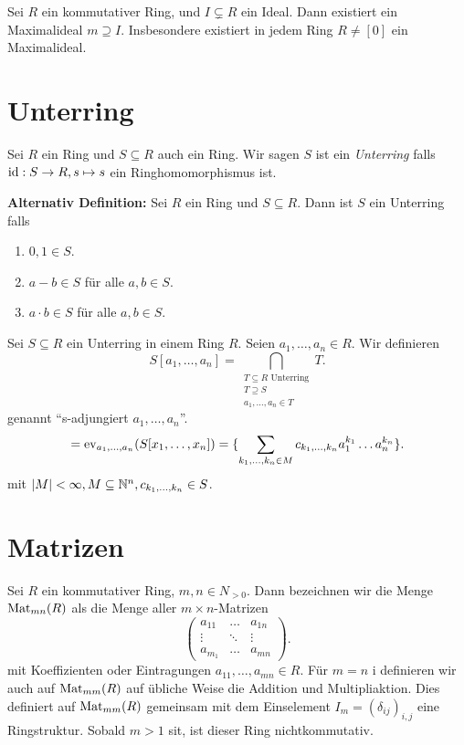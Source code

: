 \begin{theorem}
	Sei $R$ ein kommutativer Ring, und $I \subsetneq R$ ein Ideal. Dann existiert ein Maximalideal $m \supseteq I$.
	Insbesondere existiert in jedem Ring $R \neq [0]$ ein Maximalideal.
\end{theorem}


\section{Unterring}
\begin{definition}
	Sei $R$ ein Ring und $S \subseteq R$ auch ein Ring. Wir sagen $S$ ist ein \emph{Unterring} falls $\operatorname{id}: S \to R, s \mapsto s$ 
	ein Ringhomomorphismus ist.
	
	\textbf{Alternativ Definition:}
	Sei $R$ ein Ring und $S \subseteq R$. Dann ist $S$ ein Unterring falls
	\begin{enumerate}
		\item $0,1 \in S$.
		\item $a-b \in S$ für alle $a,b \in S$.
		\item $a\cdot b \in S$ für alle $a,b \in S$.
	\end{enumerate}
\end{definition}

\begin{notation}
	Sei $S \subseteq R$ ein Unterring in einem Ring $R$.
	Seien $a_1,\ldots,a_{n} \in R$. Wir definieren
	\[
		S[a_1,\ldots,a_{n}] = \bigcap_{\substack{T \subseteq R \text{ Unterring}\\ T \supseteq S\\ a_1,\ldots,a_{n} \in T}} T 
	.\] 
	genannt \enquote{s-adjungiert $a_1,\ldots,a_{n}$}.
	\[
	= \operatorname{ev}_{a_1,\ldots,a_{n}}(S[x_1,\ldots,x_{n}]) = \{\sum_{k_1,\ldots,k_{n} \in M} c_{k_1,\ldots,k_{n}} a_1^{k_1} \ldots a_{n}^{k_{n}} \} 
	.\] 
	mit $\abs{M} < \infty, M \subseteq \mathbb{N}^{n}, c_{k_1,\ldots,k_{n}} \in S$.
\end{notation}




\section{Matrizen}
Sei $R$ ein kommutativer Ring, $m,n \in N_{> 0}$.
Dann bezeichnen wir die Menge $\operatorname{Mat}_{mn}(R)$ als die Menge aller $m \times n$-Matrizen
\[
\begin{pmatrix} 
a_{11} &\ldots &a_{1n}\\
\vdots &\ddots &\vdots\\
a_{m_1} &\ldots &a_{mn}
\end{pmatrix} 
.\] 
mit Koeffizienten oder Eintragungen $a_{11},\ldots,a_{mn} \in R$.
Für $m=n$ i definieren wir auch auf $\operatorname{Mat}_{mm}(R)$ auf übliche Weise die Addition und Multipliaktion.
Dies definiert auf $\operatorname{Mat}_{mm}(R)$ gemeinsam mit dem Einselement $I_{m} = (\delta_{ij})_{i,j}$ eine Ringstruktur.
Sobald $m > 1$ sit, ist dieser Ring nichtkommutativ.

